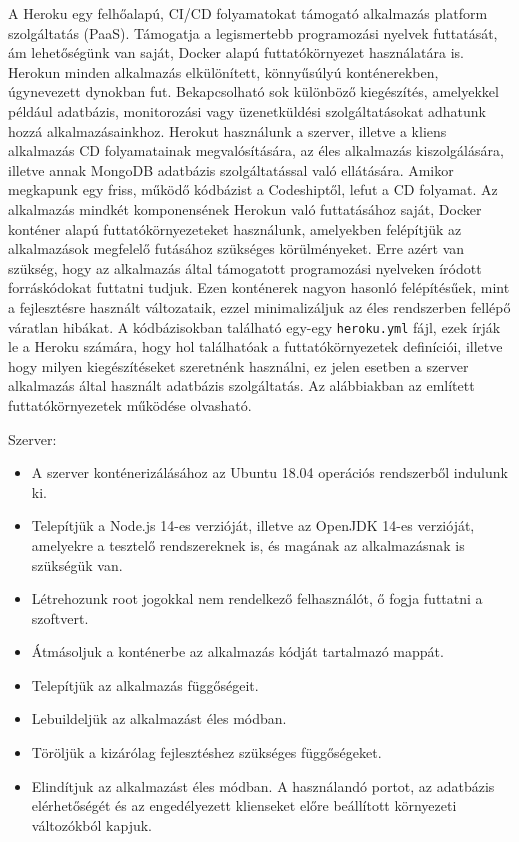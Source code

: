 \documentclass{elteikthesis}
\begin{document}
        A Heroku \cite{heroku} egy felhőalapú, CI/CD folyamatokat támogató alkalmazás platform szolgáltatás (PaaS). Támogatja a legismertebb programozási nyelvek futtatását, ám lehetőségünk van saját, Docker alapú futtatókörnyezet használatára is. Herokun minden alkalmazás elkülönített, könnyűsúlyú konténerekben, úgynevezett dynokban fut. Bekapcsolható sok különböző kiegészítés, amelyekkel például adatbázis, monitorozási vagy üzenetküldési szolgáltatásokat adhatunk hozzá alkalmazásainkhoz. Herokut használunk a szerver, illetve a kliens alkalmazás CD folyamatainak megvalósítására, az éles alkalmazás kiszolgálására, illetve annak MongoDB adatbázis szolgáltatással való ellátására. Amikor megkapunk egy friss, működő kódbázist a Codeshiptől, lefut a CD folyamat. Az alkalmazás mindkét komponensének Herokun való futtatásához saját, Docker konténer alapú futtatókörnyezeteket használunk, amelyekben felépítjük az alkalmazások megfelelő futásához szükséges körülményeket. Erre azért van szükség, hogy az alkalmazás által támogatott programozási nyelveken íródott forráskódokat futtatni tudjuk. Ezen konténerek nagyon hasonló felépítésűek, mint a fejlesztésre használt változataik, ezzel minimalizáljuk az éles rendszerben fellépő váratlan hibákat. A kódbázisokban található egy-egy \texttt{heroku.yml} fájl, ezek írják le a Heroku számára, hogy hol találhatóak a futtatókörnyezetek definíciói, illetve hogy milyen kiegészítéseket szeretnénk használni, ez jelen esetben a szerver alkalmazás által használt adatbázis szolgáltatás. Az alábbiakban az említett futtatókörnyezetek működése olvasható.

        Szerver:
        \begin{itemize}
          \setlength\itemsep{-0.5em}
          \item A szerver konténerizálásához az Ubuntu 18.04 operációs rendszerből indulunk ki.
          \item Telepítjük a Node.js 14-es verzióját, illetve az OpenJDK 14-es verzióját, amelyekre a tesztelő rendszereknek is, és magának az alkalmazásnak is szükségük van.
          \item Létrehozunk root jogokkal nem rendelkező felhasználót, ő fogja futtatni a szoftvert.
          \item Átmásoljuk a konténerbe az alkalmazás kódját tartalmazó mappát.
          \item Telepítjük az alkalmazás függőségeit.
          \item Lebuildeljük az alkalmazást éles módban.
          \item Töröljük a kizárólag fejlesztéshez szükséges függőségeket.
          \item Elindítjuk az alkalmazást éles módban. A használandó portot, az adatbázis elérhetőségét és az engedélyezett klienseket előre beállított környezeti változókból kapjuk.
        \end{itemize}
\end{document}
